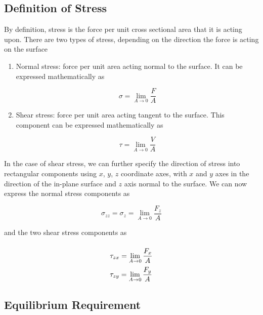 \documentclass[
10pt,
a4paper,
openany,
svgnames,
]{book}
\begin{document}
\subsection{Definition of Stress}

By definition, stress is the force per unit cross sectional area that it is acting upon. There are two types of stress, depending on the direction the force is acting on the surface

\begin{enumerate}

\item Normal stress: force per unit area acting normal to the surface. It can be expressed mathematically as

\begin{equation}
\sigma  = \mathop {\lim }\limits_{A \to 0} \frac{F}{A}
\end{equation}

\item Shear stress: force per unit area acting tangent to the surface. This component can be expressed mathematically as

  \begin{equation}
    \tau  = \mathop {\lim }\limits_{A \to 0} \frac{V}{A}
  \end{equation}
\end{enumerate}

In the case of shear stress, we can further specify the direction of stress into rectangular components using $x$, $y$, $z$ coordinate axes, with $x$ and $y$ axes in the direction of the in-plane surface and $z$ axis normal to the surface. We can now express the normal stress components as

\begin{equation}
  \sigma _{zz} = \sigma _z = \mathop {\lim }\limits_{A \to 0} \frac{F_z}{A}
\end{equation}

and the two shear stress components as

\begin{equation}
  \arraycolsep=1.4pt\def\arraystretch{2.2}
  \begin{array}{l}
    \tau _{zx} = \mathop {\lim }\limits_{A \to 0} \dfrac{F_x}{A} \\
    \tau _{zy} = \mathop {\lim }\limits_{A \to 0} \dfrac{F_y}{A}
  \end{array}
\end{equation}

\subsection{Equilibrium Requirement}
\end{document}
